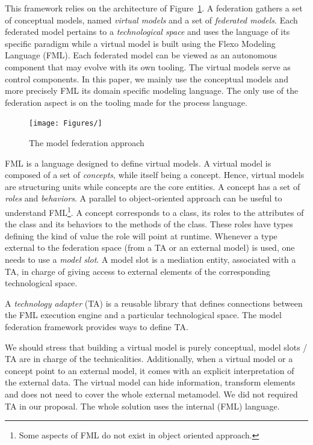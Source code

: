 This framework relies on the architecture of Figure~\ref{fig:mf}. A federation
gathers a set of conceptual models, named \emph{virtual models} and a
set of \emph{federated models}. Each federated model pertains to a
\emph{technological space} and uses the language of its specific
paradigm while a virtual model is built using the Flexo Modeling
Language (FML). Each federated model can be viewed as an autonomous
component that may evolve with its own tooling. The virtual models
serve as control components.
In this paper, we mainly use the conceptual models and more precisely FML its domain specific modeling language. The only use of the federation aspect is on the tooling made for the process language.

\begin{figure}[t]
    \centering
    \texttt{[image: Figures/]}
    \caption{The model federation approach}
    \label{fig:mf}
\end{figure}

FML is a language designed to define virtual models. A virtual model
is composed of a set of \emph{concepts}, while itself being a concept.
Hence, virtual models are structuring units while concepts are the
core entities. A concept has a set of \emph{roles} and
\emph{behaviors}. A parallel to object-oriented approach can be useful
to understand FML\footnote{Some aspects of FML do not exist in object oriented approach.}. A concept corresponds to a class, its roles to the
attributes of the class and its behaviors to the methods of the class.
These roles have types defining the kind of value the role will point
at runtime.
Whenever a type external to the federation space (from a TA or an
external model) is used, one needs to use a \emph{model slot}. A model
slot is a mediation entity, associated with a TA, in charge of giving
access to external elements of the corresponding technological space.

A \emph{technology adapter} (TA) is a reusable library that defines
connections between the FML execution engine and a particular
technological space. The model federation framework provides ways to
define TA.

We should stress that building a virtual model is purely conceptual,
model slots / TA are in charge of the technicalities. Additionally,
when a virtual model or a concept point to an external model, it comes
with an explicit interpretation of the external data. The virtual
model can hide information, transform elements and does not need to
cover the whole external metamodel.
We did not required TA in our proposal. The whole solution uses the
internal (FML) language.

